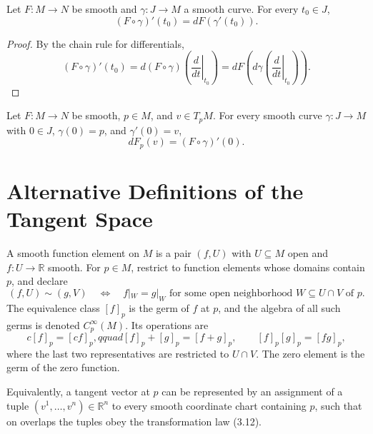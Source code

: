 \begin{proposition}
\label{prop:3-24}
\leanok
{}
Let $F:M\to N$ be smooth and $\gamma:J\to M$ a smooth curve. For every
$t_0\in J$,
\[
(F\circ\gamma)'(t_0)=dF(\gamma'(t_0)).
\]
\end{proposition}

\begin{proof}
\leanok
\sketch
By the chain rule for differentials,
\[
(F\circ\gamma)'(t_0)
=d(F\circ\gamma)\left(\left.\frac{d}{dt}\right|_{t_0}\right)
=dF\left(d\gamma\left(\left.\frac{d}{dt}\right|_{t_0}\right)\right).
\]
\end{proof}

\begin{corollary}
\label{cor:3-25}
\leanok
{}
Let $F:M\to N$ be smooth, $p\in M$, and $v\in T_pM$. For every smooth curve
$\gamma:J\to M$ with $0\in J$, $\gamma(0)=p$, and $\gamma'(0)=v$,
\[
dF_p(v)=(F\circ\gamma)'(0).
\]
\end{corollary}


\section{Alternative Definitions of the Tangent Space}

\begin{definition}
\label{def:3-18-extra-1}
\mathlibok
A smooth function element on $M$ is a pair $(f,U)$ with $U\subseteq M$ open
and $f:U\to\mathbb{R}$ smooth. For $p\in M$, restrict to function elements
whose domains contain $p$, and declare
\[
(f,U)\sim(g,V)
\quad\Longleftrightarrow\quad
f|_W=g|_W\text{ for some open neighborhood }W\subseteq U\cap V\text{ of }p.
\]
The equivalence class $[f]_p$ is the germ of $f$ at $p$, and the algebra of
all such germs is denoted $C_p^\infty(M)$. Its operations are
\[
c[f]_p=[cf]_p,qquad [f]_p+[g]_p=[f+g]_p,
\qquad [f]_p[g]_p=[fg]_p,
\]
where the last two representatives are restricted to $U\cap V$. The zero
element is the germ of the zero function.
\end{definition}

\begin{definition}
\label{def:3-18-extra-4}
\leanok
Equivalently, a tangent vector at $p$ can be represented by an assignment of a
tuple $(v^1,\ldots,v^n)\in\mathbb{R}^n$ to every smooth coordinate chart
containing $p$, such that on overlaps the tuples obey the transformation law
(3.12).
\end{definition}


